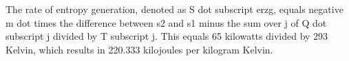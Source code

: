 The rate of entropy generation, denoted as S dot subscript erzg, equals negative m dot times the difference between s2 and s1 minus the sum over j of Q dot subscript j divided by T subscript j. This equals 65 kilowatts divided by 293 Kelvin, which results in 220.333 kilojoules per kilogram Kelvin.